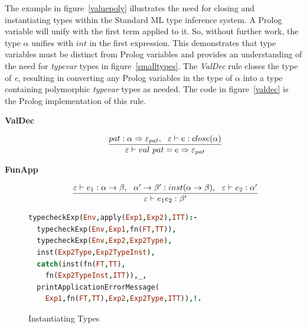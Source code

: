 \documentclass[10pt]{luthercs}
\begin{document}
The example in figure~\ref{valuepoly} illustrates the need for closing and instantiating types within the Standard ML type inference system. A Prolog variable will unify with the first term applied to it. So, without further work, the type $\alpha$ unifies with $int$ in the first expression. This demonstrates that type variables must be distinct from Prolog variables and provides an understanding of the need for {\em typevar} types in figure~\ref{smalltypes}. The {\em ValDec} rule closes the type of {\em e}, resulting in converting any Prolog variables in the type of $\alpha$ into a type containing polymorphic {\em typevar} types as needed. The code in figure~\ref{valdec} is the Prolog implementation of this rule. 

\begin{description}
\item[{\textbf{ValDec}}] \begin{gather}
\begin{split}\frac{pat:\alpha\Rightarrow\varepsilon_{pat},~~\varepsilon\vdash e:close(\alpha)}{\varepsilon\vdash val~pat=e\Rightarrow\varepsilon_{pat}}\end{split}\notag
\end{gather}
\end{description}

\begin{description}
\item[{\textbf{FunApp}}] \begin{gather}
\begin{split}\frac{\varepsilon\vdash e_1 : \alpha\rightarrow\beta, ~~ \alpha'\rightarrow\beta':inst(\alpha\rightarrow\beta),~~ \varepsilon\vdash e_2 : \alpha'}
     {\varepsilon\vdash e_1 e_2 : \beta'}\end{split}\notag
\end{gather}
\end{description}

\begin{figure}[htbp]
\begin{lstlisting}[language=Prolog]
typecheckExp(Env,apply(Exp1,Exp2),ITT):- 
  typecheckExp(Env,Exp1,fn(FT,TT)), 
  typecheckExp(Env,Exp2,Exp2Type), 
  inst(Exp2Type,Exp2TypeInst),
  catch(inst(fn(FT,TT), 
    fn(Exp2TypeInst,ITT)),_, 
  printApplicationErrorMessage(
    Exp1,fn(FT,TT),Exp2,Exp2Type,ITT)),!.
\end{lstlisting}
\caption{Instantiating Types}
\label{funapp}
\end{figure}
\end{document}
